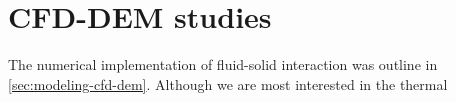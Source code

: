 \chapter{CFD-DEM studies}\label{sec:cfd-dem-studies}
The numerical implementation of fluid-solid interaction was outline in \cref{sec:modeling-cfd-dem}. Although we are most interested in the thermal 



